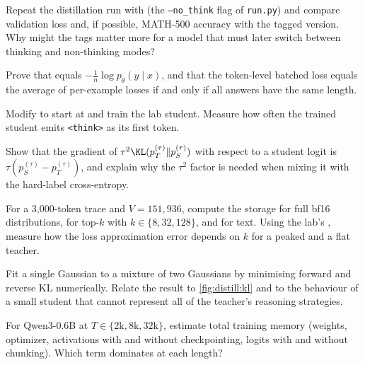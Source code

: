 \begin{exercise}\label{ex:distill:nothink}
Repeat the distillation run with  (the \texttt{--no\_think} flag of
\texttt{run.py}) and compare validation loss and, if possible, MATH-500 accuracy with the tagged
version. Why might the tags matter more for a model that must later switch between thinking and
non-thinking modes?
\end{exercise}

\begin{exercise}
Prove that  equals $-\frac{1}{n}\log p_\theta(y\mid x)$, and that the
token-level batched loss equals the average of per-example losses if and only if all answers have
the same length.
\end{exercise}

\begin{exercise}
Modify  to start at  and train the lab student. Measure
how often the trained student emits \texttt{<think>} as its first token.
\end{exercise}

\begin{exercise}[KD temperature]
Show that the gradient of $\tau^2\KL(p_T^{(\tau)}\|p_S^{(\tau)})$ with respect to a student logit
is $\tau(p_S^{(\tau)}-p_T^{(\tau)})$, and explain why the $\tau^2$ factor is needed when mixing it
with the hard-label cross-entropy.
\end{exercise}

\begin{exercise}
For a 3{,}000-token trace and $V=151{,}936$, compute the storage for full bf16 distributions, for
top-$k$ with $k\in\{8,32,128\}$, and for text. Using the lab's , measure how
the loss approximation error depends on $k$ for a peaked and a flat teacher.
\end{exercise}

\begin{exercise}
Fit a single Gaussian to a mixture of two Gaussians by minimising forward and reverse KL
numerically. Relate the result to \cref{fig:distill:kl} and to the behaviour of a small student
that cannot represent all of the teacher's reasoning strategies.
\end{exercise}

\begin{exercise}
For Qwen3-0.6B at $T\in\{2\text{k},8\text{k},32\text{k}\}$, estimate total training memory
(weights, optimizer, activations with and without checkpointing, logits with and without
chunking). Which term dominates at each length?
\end{exercise}

